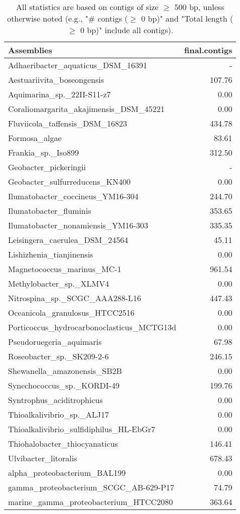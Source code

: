 \documentclass[12pt,a4paper]{article}
\begin{document}
\begin{table}[ht]
\begin{center}
\caption{All statistics are based on contigs of size $\geq$ 500 bp, unless otherwise noted (e.g., "\# contigs ($\geq$ 0 bp)" and "Total length ($\geq$ 0 bp)" include all contigs).}
\begin{tabular}{|l*{1}{|r}|}
\hline
Assemblies & final.contigs \\ \hline
Adhaeribacter\_aquaticus\_DSM\_16391 & - \\ \hline
Aestuariivita\_boseongensis & 107.76 \\ \hline
Aquimarina\_sp.\_22II-S11-z7 & 0.00 \\ \hline
Coraliomargarita\_akajimensis\_DSM\_45221 & 0.00 \\ \hline
Fluviicola\_taffensis\_DSM\_16823 & 434.78 \\ \hline
Formosa\_algae & 83.61 \\ \hline
Frankia\_sp.\_Iso899 & 312.50 \\ \hline
Geobacter\_pickeringii & - \\ \hline
Geobacter\_sulfurreducens\_KN400 & 0.00 \\ \hline
Ilumatobacter\_coccineus\_YM16-304 & 244.70 \\ \hline
Ilumatobacter\_fluminis & 353.65 \\ \hline
Ilumatobacter\_nonamiensis\_YM16-303 & 335.35 \\ \hline
Leisingera\_caerulea\_DSM\_24564 & 45.11 \\ \hline
Lishizhenia\_tianjinensis & 0.00 \\ \hline
Magnetococcus\_marinus\_MC-1 & 961.54 \\ \hline
Methylobacter\_sp.\_XLMV4 & 0.00 \\ \hline
Nitrospina\_sp.\_SCGC\_AAA288-L16 & 447.43 \\ \hline
Oceanicola\_granulosus\_HTCC2516 & 0.00 \\ \hline
Porticoccus\_hydrocarbonoclasticus\_MCTG13d & 0.00 \\ \hline
Pseudoruegeria\_aquimaris & 67.98 \\ \hline
Roseobacter\_sp.\_SK209-2-6 & 246.15 \\ \hline
Shewanella\_amazonensis\_SB2B & 0.00 \\ \hline
Synechococcus\_sp.\_KORDI-49 & 199.76 \\ \hline
Syntrophus\_aciditrophicus & 0.00 \\ \hline
Thioalkalivibrio\_sp.\_ALJ17 & 0.00 \\ \hline
Thioalkalivibrio\_sulfidiphilus\_HL-EbGr7 & 0.00 \\ \hline
Thiohalobacter\_thiocyanaticus & 146.41 \\ \hline
Ulvibacter\_litoralis & 678.43 \\ \hline
alpha\_proteobacterium\_BAL199 & 0.00 \\ \hline
gamma\_proteobacterium\_SCGC\_AB-629-P17 & 74.79 \\ \hline
marine\_gamma\_proteobacterium\_HTCC2080 & 363.64 \\ \hline
\end{tabular}
\end{center}
\end{table}
\end{document}
